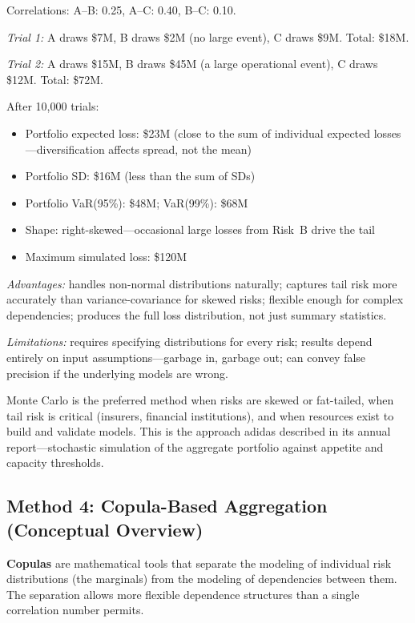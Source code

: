\documentclass[11pt,openany]{book}
\providecommand{\tightlist}{\setlength{\itemsep}{0pt}\setlength{\parskip}{0pt}}
\begin{document}
Correlations: A--B: 0.25, A--C: 0.40, B--C: 0.10.

\emph{Trial 1:} A draws \$7M, B draws \$2M (no large event), C draws \$9M.
Total: \$18M.

\emph{Trial 2:} A draws \$15M, B draws \$45M (a large operational event), C
draws \$12M. Total: \$72M.

After 10{,}000 trials:
\begin{itemize}\tightlist
  \item Portfolio expected loss: \$23M (close to the sum of individual
        expected losses---diversification affects spread, not the mean)
  \item Portfolio SD: \$16M (less than the sum of SDs)
  \item Portfolio VaR(95\%): \$48M; VaR(99\%): \$68M
  \item Shape: right-skewed---occasional large losses from Risk~B drive the
        tail
  \item Maximum simulated loss: \$120M
\end{itemize}

\emph{Advantages:} handles non-normal distributions naturally; captures tail
risk more accurately than variance-covariance for skewed risks; flexible
enough for complex dependencies; produces the full loss distribution, not just
summary statistics.

\emph{Limitations:} requires specifying distributions for every risk; results
depend entirely on input assumptions---garbage in, garbage out; can convey
false precision if the underlying models are wrong.

Monte Carlo is the preferred method when risks are skewed or fat-tailed, when
tail risk is critical (insurers, financial institutions), and when resources
exist to build and validate models. This is the approach adidas described in
its annual report---stochastic simulation of the aggregate portfolio against
appetite and capacity thresholds.

\subsection{Method 4: Copula-Based Aggregation (Conceptual Overview)}
\label{subsec:copulas}

\textbf{Copulas} are mathematical tools that separate the modeling of
individual risk distributions (the marginals) from the modeling of
dependencies between them. The separation allows more flexible dependence
structures than a single correlation number permits.
\end{document}
